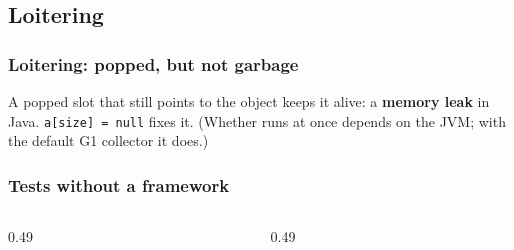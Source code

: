 \documentclass[aspectratio=169,10pt,compress]{beamer}
\begin{document}
\subsection[Loitering]{Loitering}




\begin{frame}[t,fragile] \frametitle{Loitering: popped, but not garbage}

  \vspace{0.2em}
  \small A popped slot that still points to the object keeps it alive: a \textbf{memory leak} in Java. \texttt{a[size] = null} fixes it.
  (Whether  runs at once depends on the JVM; with the default G1 collector it does.)
\end{frame}





\begin{frame}[t,fragile] \frametitle{Tests without a framework}
  \begin{columns}[T]
    \begin{column}{0.49\textwidth}
    \end{column}
    \begin{column}{0.49\textwidth}
    \end{column}
  \end{columns}
\end{frame}
\end{document}
